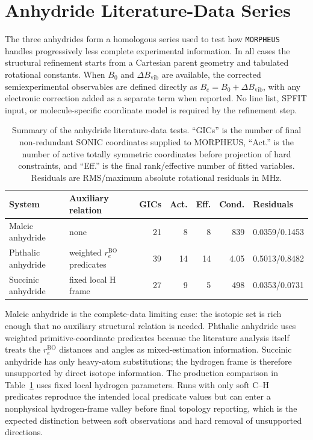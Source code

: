 \documentclass[12pt]{article}
\begin{document}
\section{Anhydride Literature-Data Series}

The three anhydrides form a homologous series used to test how
\texttt{MORPHEUS} handles progressively less complete experimental
information. In all cases the structural refinement starts from a Cartesian
parent geometry and tabulated rotational constants. When $B_0$ and
$\Delta B_\mathrm{vib}$ are available, the corrected semiexperimental
observables are defined directly as $B_e=B_0+\Delta B_\mathrm{vib}$, with any
electronic correction added as a separate term when reported. No line list,
SPFIT input, or molecule-specific coordinate model is required by the
refinement step.

\begin{table}
\caption{Summary of the anhydride literature-data tests. ``GICs'' is the
number of final non-redundant SONIC coordinates supplied to MORPHEUS,
``Act.'' is
the number of active totally symmetric coordinates before projection of hard
constraints, and ``Eff.'' is the final rank/effective number of fitted
variables. Residuals are RMS/maximum absolute rotational residuals in MHz.}
\label{tab:si-anhydride-series}
\scriptsize
\setlength{\tabcolsep}{3pt}
\begin{tabular}{llrrrrl}
\toprule
System & Auxiliary relation & GICs & Act. & Eff. & Cond. & Residuals \\
\midrule
Maleic anhydride & none & 21 & 8 & 8 & 839 & 0.0359/0.1453 \\
Phthalic anhydride & weighted $r_e^\mathrm{BO}$ predicates & 39 & 14 & 14 & 4.05 & 0.5013/0.8482 \\
Succinic anhydride & fixed local H frame & 27 & 9 & 5 & 498 & 0.0353/0.0731 \\
\bottomrule
\end{tabular}
\end{table}

Maleic anhydride is the complete-data limiting case: the isotopic set is rich
enough that no auxiliary structural relation is needed. Phthalic anhydride
uses weighted primitive-coordinate predicates because the literature analysis
itself treats the $r_e^\mathrm{BO}$ distances and angles as mixed-estimation
information. Succinic anhydride has only heavy-atom substitutions; the
hydrogen frame is therefore unsupported by direct isotope information. The
production comparison in Table~\ref{tab:si-anhydride-series} uses fixed local
hydrogen parameters. Runs with only soft C--H predicates reproduce the intended
local predicate values but can enter a nonphysical hydrogen-frame valley before
final topology reporting, which is the expected distinction between soft
observations and hard removal of unsupported directions.
\end{document}
